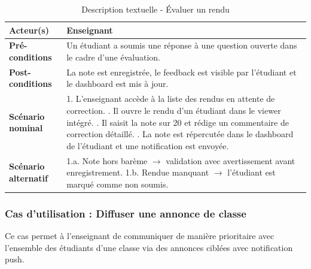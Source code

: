 \begin{table}[H]
\centering
\small
\begin{tabularx}{\textwidth}{|l|X|}
\hline
\rowcolor[HTML]{EFEFEF} 
\textbf{Acteur(s)} & Enseignant \\ \hline
\textbf{Pré-conditions} & Un étudiant a soumis une réponse à une question ouverte dans le cadre d'une évaluation. \\ \hline
\textbf{Post-conditions} & La note est enregistrée, le feedback est visible par l'étudiant et le dashboard est mis à jour. \\ \hline
\textbf{Scénario nominal} & 
1. L'enseignant accède à la liste des rendus en attente de correction. \newline
2. Il ouvre le rendu d'un étudiant dans le viewer intégré. \newline
3. Il saisit la note sur 20 et rédige un commentaire de correction détaillé. \newline
4. La note est répercutée dans le dashboard de l'étudiant et une notification est envoyée. \\ \hline
\textbf{Scénario alternatif} & 
1.a. Note hors barème $\rightarrow$ validation avec avertissement avant enregistrement. \newline
1.b. Rendue manquant $\rightarrow$ l'étudiant est marqué comme non soumis. \\ \hline
\end{tabularx}
\caption{Description textuelle - Évaluer un rendu}
\end{table}

\subsubsection{Cas d'utilisation : Diffuser une annonce de classe}
Ce cas permet à l'enseignant de communiquer de manière prioritaire avec l'ensemble des étudiants d'une classe via des annonces ciblées avec notification push.

